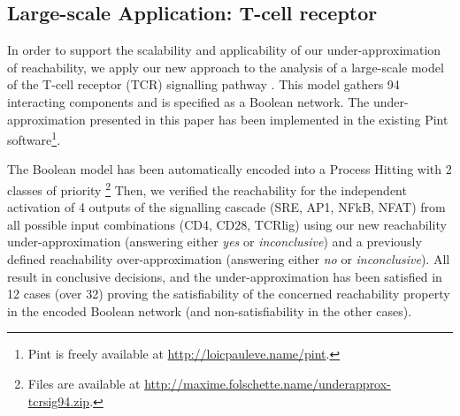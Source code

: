 \subsection{Large-scale Application: T-cell receptor}
\label{ssec:ex-tcrsig}

In order to support the scalability and applicability of our under-approximation of reachability, we
apply our new approach to the analysis of a large-scale model of the T-cell receptor (TCR)
signalling pathway \cite{tcrsig94}.
This model gathers 94 interacting components and is specified as a Boolean network.
The under-approximation presented in this paper has been implemented in the existing Pint
software\footnote{Pint is freely available at \url{http://loicpauleve.name/pint}.}.

The Boolean model has been automatically encoded into a Process Hitting with 2 classes of priority%
\footnote{Files are available at
\url{http://maxime.folschette.name/underapprox-tcrsig94.zip}.}
Then, we verified the reachability for the independent activation of 4 outputs of the signalling
cascade (SRE, AP1, NFkB, NFAT) from all possible input combinations (CD4, CD28, TCRlig) using our
new reachability under-approximation (answering either \emph{yes} or \emph{inconclusive}) and a 
previously defined reachability over-approximation \cite{PMR12-MSCS} (answering either \emph{no} or
\emph{inconclusive}).
All result in conclusive decisions, and the under-approximation has been satisfied in 12 cases (over
32) proving the satisfiability of the concerned reachability property in the encoded Boolean network
(and non-satisfiability in the other cases).


